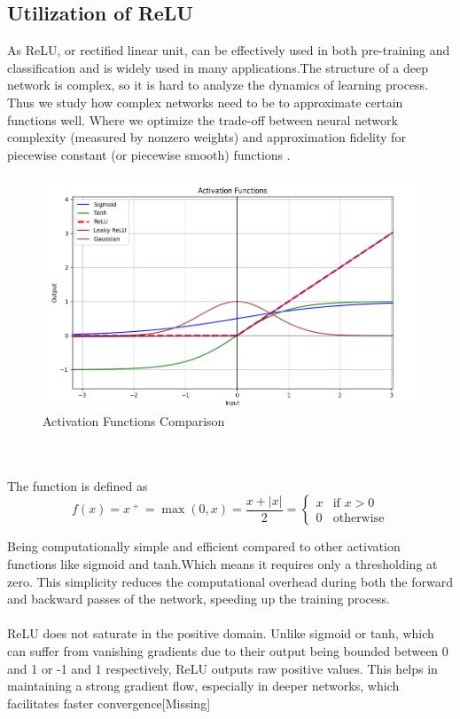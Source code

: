 \documentclass[conference]{IEEEtran}
\begin{document}
\subsection{Utilization of ReLU}
As ReLU, or rectified linear unit, can be effectively used in both pre-training and classification and is widely used in many applications.The structure of a deep network is complex, so it is hard to analyze the dynamics of learning process. Thus we study how complex networks need to be to approximate certain functions well. Where we optimize the trade-off between neural network complexity (measured by nonzero weights) and approximation fidelity for piecewise constant (or piecewise smooth) functions \cite{b1}.
\begin{figure}[h]
    \centering
    \includegraphics[width=\linewidth]{Activation Functions Compare.PNG}
    \caption{Activation Functions Comparison}
    \label{fig}
\end{figure}
\\
\\
The function is defined as
\[f(x) = x^{\ +\ } = \max(0,x) = \frac{x+|x|}{2} = \begin{cases}
x & \text{if } x > 0\\
0 & \text{otherwise}
\end{cases}
\]

Being computationally simple and efficient compared to other activation functions like sigmoid and tanh.Which means it requires only a thresholding at zero. This simplicity reduces the computational overhead during both the forward and backward passes of the network, speeding up the training process.
\\
\\
ReLU does not saturate in the positive domain. Unlike sigmoid or tanh, which can suffer from vanishing gradients due to their output being bounded between 0 and 1 or -1 and 1 respectively, ReLU outputs raw positive values. This helps in maintaining a strong gradient flow, especially in deeper networks, which facilitates faster convergence[Missing]
\end{document}
